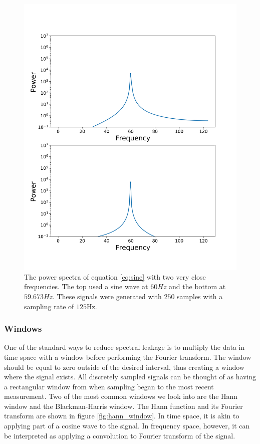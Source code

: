 \documentclass[twocolumn]{article}
\begin{document}
\begin{figure}
  \includegraphics[width=\linewidth]{power_spectrum.png}
  \caption{
    The power spectra of equation \ref{eq:sine} with two very close
    frequencies. The top used a sine wave at $60Hz$ and the bottom at $59.673Hz$. These signals were generated with $250$ samples with
    a sampling rate of $125$Hz.
  }
  \label{fig:power_spectra}
\end{figure}

\subsubsection{Windows}
One of the standard ways to reduce spectral leakage is to multiply the data in
time space with a window before performing the Fourier transform. The
window should be equal to zero outside of the desired interval, thus
creating a window where the signal exists. All discretely sampled
signals can be thought of as having a rectangular window from when
sampling began to the most recent measurement. Two of the
most common windows we look into are the Hann window and the Blackman-Harris
window. The Hann function and its Fourier transform are shown in figure
\ref{fig:hann_window}. In time space, it is akin to applying part of a
cosine wave to the signal. In frequency space, however, it can be
interpreted as applying a convolution to Fourier transform of the
signal. 
\end{document}
